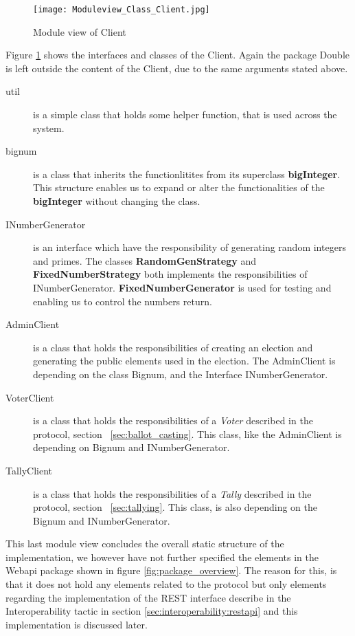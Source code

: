 \begin{figure}[H]
    \centering
    \texttt{[image: Moduleview\_Class\_Client.jpg]}
    \caption{Module view of Client}
    \label{fig:module_view_of_client}
\end{figure}

\noindent
Figure \ref{fig:module_view_of_client} shows the interfaces and classes of the Client. Again the package Double is left outside the content of the Client, due to the same arguments stated above. 

\begin{description}
    \item[util] is a simple class that holds some helper function, that is used across the system. 
    
    \item[bignum] is a class that inherits the functionlitites from its superclass \textbf{bigInteger}. This structure enables us to expand or alter the functionalities of the \textbf{bigInteger} without changing the class. 
    
    \item[INumberGenerator] is an interface which have the responsibility of generating random integers and primes. The classes \textbf{RandomGenStrategy} and \textbf{FixedNumberStrategy} both implements the responsibilities of INumberGenerator. \textbf{FixedNumberGenerator} is used for testing and enabling us to control the numbers return. 

    \item[AdminClient] is a class that holds the responsibilities of creating an election and generating the public elements used in the election. The AdminClient is depending on the class Bignum, and the Interface INumberGenerator. 
    
    \item[VoterClient] is a class that holds the responsibilities of a \textit{Voter} described in the protocol, section ~\ref{sec:ballot_casting}. This class, like the AdminClient is depending on Bignum and INumberGenerator.    
    
    \item[TallyClient] is a class that holds the responsibilities of a \textit{Tally} described in the protocol, section ~\ref{sec:tallying}. This class, is also depending on the Bignum and INumberGenerator. 
\end{description}

\noindent
This last module view concludes the overall static structure of the implementation, we however have not further specified the elements in the Webapi package shown in figure \ref{fig:package_overview}. The reason for this, is that it does not hold any elements related to the protocol but only elements regarding the implementation of the REST interface describe in the Interoperability tactic in section \ref{sec:interoperability:restapi} and this implementation is discussed later. \\

